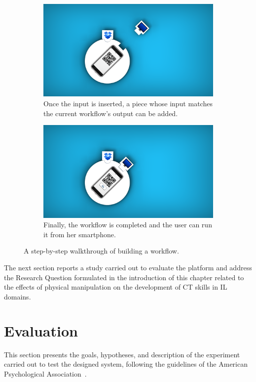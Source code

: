 \begin{figure}[ht!]
\begin{subfigure}[b]{0.48\linewidth}
  \end{subfigure}
  \begin{subfigure}[b]{0.48\linewidth}
    \centering
    \includegraphics[width=0.75\linewidth,trim={800 200 1600 200},clip]{images/c4/TAPAS-3.png} 
    \caption{Once the in\-put is in\-sert\-ed, a piece whose in\-put match\-es the cur\-rent work\-flow's out\-put can be add\-ed.}\label{fig:walkthrough:c}
  \end{subfigure}\hfill
  \begin{subfigure}[b]{0.48\linewidth}
    \centering
    \includegraphics[width=0.75\linewidth,trim={800 200 1600 200},clip]{images/c4/TAPAS-4.png} 
    \caption{Fi\-nal\-ly, the work\-flow is com\-plet\-ed and the us\-er can run it from her smart\-phone.}\label{fig:walkthrough:d}
  \end{subfigure}
  \caption{A step-by-step walkthrough of building a workflow.}\label{fig:walkthrough}
\end{figure}

The next section reports a study carried out to evaluate the platform and address the Research Question formulated in the introduction of this chapter related to the effects of physical manipulation on the development of \ac{CT} skills in \ac{IL} domains.

\section{Evaluation}\label{sec:ev4}
This section presents the goals, hypotheses, and description of the experiment carried out to test the designed system, following the guidelines of the American Psychological Association~\cite{Wohlin:2000:ESE:330775}.

